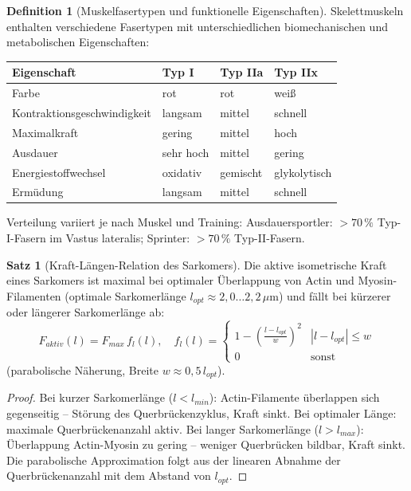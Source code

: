 ﻿\documentclass[a4paper,12pt]{report}
\theoremstyle{definition}
\newtheorem{definition}{Definition}
\newtheorem{satz}{Satz}
\begin{document}
\begin{definition}[Muskelfasertypen und funktionelle Eigenschaften]
Skelettmuskeln enthalten verschiedene Fasertypen mit unterschiedlichen
biomechanischen und metabolischen Eigenschaften:
\begin{center}
\begin{tabular}{llll}
\toprule
Eigenschaft & Typ I & Typ IIa & Typ IIx \\
\midrule
Farbe & rot & rot & weiß \\
Kontraktionsgeschwindigkeit & langsam & mittel & schnell \\
Maximalkraft & gering & mittel & hoch \\
Ausdauer & sehr hoch & mittel & gering \\
Energiestoffwechsel & oxidativ & gemischt & glykolytisch \\
Ermüdung & langsam & mittel & schnell \\
\bottomrule
\end{tabular}
\end{center}
Verteilung variiert je nach Muskel und Training:
Ausdauersportler: $> 70\,\%$ Typ-I-Fasern im Vastus lateralis;
Sprinter: $> 70\,\%$ Typ-II-Fasern.
\end{definition}

\begin{satz}[Kraft-Längen-Relation des Sarkomers]
Die aktive isometrische Kraft eines Sarkomers ist maximal bei optimaler
Überlappung von Actin und Myosin-Filamenten (optimale Sarkomerlänge
$l_{opt} \approx 2{,}0\ldots2{,}2\,\mu\mathrm{m}$) und fällt bei kürzerer
oder längerer Sarkomerlänge ab:
\[
  F_{aktiv}(l) = F_{max}\,f_l(l), \quad
  f_l(l) = \begin{cases}
    1 - \left(\frac{l-l_{opt}}{w}\right)^2 & |l-l_{opt}| \le w \\
    0 & \text{sonst}
  \end{cases}
\]
(parabolische Näherung, Breite $w \approx 0{,}5\,l_{opt}$).
\end{satz}
\begin{proof}
Bei kurzer Sarkomerlänge ($l < l_{min}$): Actin-Filamente überlappen
sich gegenseitig -- Störung des Querbrückenzyklus, Kraft sinkt.
Bei optimaler Länge: maximale Querbrückenanzahl aktiv.
Bei langer Sarkomerlänge ($l > l_{max}$): Überlappung Actin-Myosin zu gering --
weniger Querbrücken bildbar, Kraft sinkt. Die parabolische Approximation
folgt aus der linearen Abnahme der Querbrückenanzahl mit dem Abstand von $l_{opt}$.
\end{proof}
\end{document}
